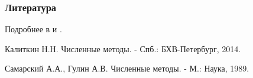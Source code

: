 \documentclass[10pt]{beamer}
\begin{document}
\begin{frame}[fragile]
\frametitle{Литература}
Подробнее в \cite[стр. 44]{Kalitkin} и \cite[стр. 65]{Samarsky}.



\begin{thebibliography}{99}

Калиткин Н.Н. Численные методы. - Спб.: БХВ-Петербург, 2014.

Самарский А.А., Гулин А.В. Численные методы. - М.: Наука, 1989.

\end{thebibliography}
\end{frame}
\end{document}
